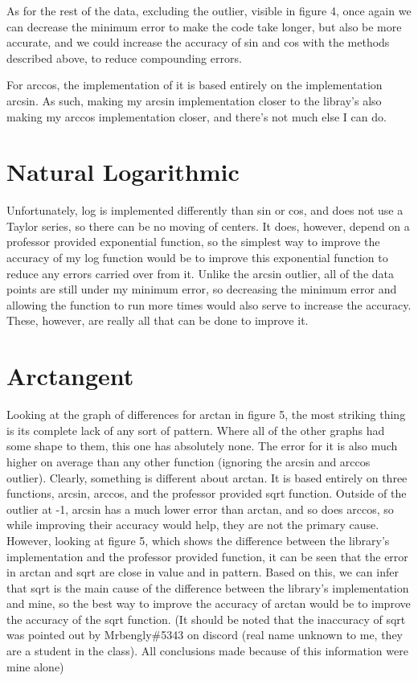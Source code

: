 \documentclass[11pt]{article}
\begin{document}
As for the rest of the data, excluding the outlier, visible in figure 4, once again we can decrease the minimum error to make the code take longer, but also be more accurate, and we could increase the accuracy of sin and cos with the methods described above, to reduce compounding errors.

For arccos, the implementation of it is based entirely on the implementation arcsin. As such, making my arcsin implementation closer to the libray's also making my arccos implementation closer, and there's not much else I can do.

\section{Natural Logarithmic}

Unfortunately, log is implemented differently than sin or cos, and does not use a Taylor series, so there can be no moving of centers. It does, however, depend on a professor provided exponential function, so the simplest way to improve the accuracy of my log function would be to improve this exponential function to reduce any errors carried over from it. Unlike the arcsin outlier, all of the data points are still under my minimum error, so decreasing the minimum error and allowing the function to run more times would also serve to increase the accuracy. These, however, are really all that can be done to improve it.

\section{Arctangent}

Looking at the graph of differences for arctan in figure 5, the most striking thing is its complete lack of any sort of pattern. Where all of the other graphs had some shape to them, this one has absolutely none. The error for it is also much higher on average than any other function (ignoring the arcsin and arccos outlier). Clearly, something is different about arctan. It is based entirely on three functions, arcsin, arccos, and the professor provided sqrt function. Outside of the outlier at -1, arcsin has a much lower error than arctan, and so does arccos, so while improving their accuracy would help, they are not the primary cause. However, looking at figure 5, which shows the difference between the library's implementation and the professor provided function, it can be seen that the error in arctan and sqrt are close in value and in pattern. Based on this, we can infer that sqrt is the main cause of the difference between the library's implementation and mine, so the best way to improve the accuracy of arctan would be to improve the accuracy of the sqrt function. (It should be noted that the inaccuracy of sqrt was pointed out by Mrbengly\#5343 on discord (real name unknown to me, they are a student in the class). All conclusions made because of this information were mine alone)
\end{document}
